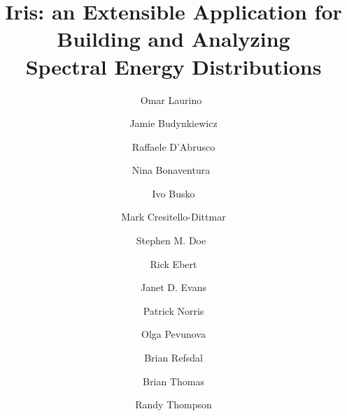 \documentclass[preprint,authoryear,5p]{elsarticle}
\begin{document}
\begin{frontmatter}



\title{Iris: an Extensible Application for Building and Analyzing\\
Spectral Energy Distributions}

\author[sao]{Omar Laurino~}

\author[sao]{Jamie Budynkiewicz}

\author[sao]{Raffaele D'Abrusco}

\author[sao]{Nina Bonaventura~}

\author[stsci]{Ivo Busko}

\author[sao]{Mark Cresitello-Dittmar}

\author[sao]{Stephen M. Doe~}

\author[ipac]{Rick Ebert}

\author[sao]{Janet D. Evans}

\author[noao]{Patrick Norris}

\author[ipac]{Olga Pevunova}

\author[sao]{Brian Refsdal}

\author[noao]{Brian Thomas}

\author[stsci]{Randy Thompson}

\address[sao]{Smithsonian Astrophysical Observatory, 60 Garden St.
Cambridge, MA 02138}
\address[stsci]{Space Telescope Science Institute, 3700 San Martin Dr.
Baltimore, MD 21218}
\address[ipac]{Infrared Processing and Analysis Center, 770 South Wilson Ave.
Pasadena, CA 91125}
\address[noao]{National Optical Astronomy Observatory, 950 N Cherry Ave.
Tucson, AZ 85719}


\end{frontmatter}
\end{document}
